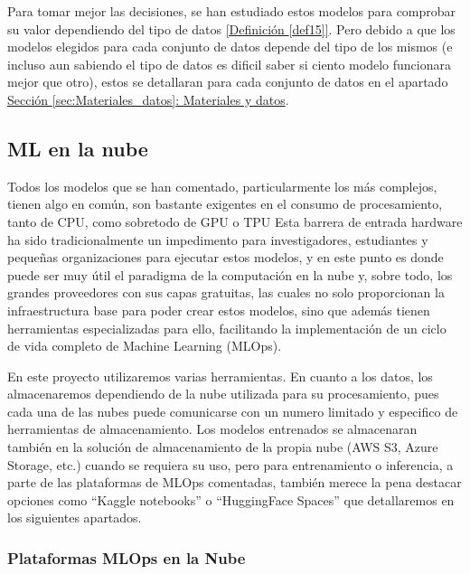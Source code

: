 Para tomar mejor las decisiones, se han estudiado estos modelos para comprobar su valor dependiendo del tipo de datos \hyperref[def15]{[Definición \ref*{def15}]}. Pero debido a que los modelos elegidos para cada conjunto de datos depende del tipo de los mismos (e incluso aun sabiendo el tipo de datos es dificil saber si ciento modelo funcionara mejor que otro), estos se detallaran para cada conjunto de datos en el apartado \hyperref[sec:Materiales_datos]{Sección \ref*{sec:Materiales_datos}: Materiales y datos}.

\subsection{ML en la nube}

Todos los modelos que se han comentado, particularmente los más complejos, tienen algo en común, son bastante exigentes en el consumo de procesamiento, tanto de CPU, como sobretodo de GPU o TPU \citep{Sze_2017} Esta barrera de entrada hardware ha sido tradicionalmente un impedimento para investigadores, estudiantes y pequeñas organizaciones para ejecutar estos modelos, y en este punto es donde puede ser muy útil el paradigma de la computación en la nube y, sobre todo, los grandes proveedores con sus capas gratuitas, las cuales no solo proporcionan la infraestructura base para poder crear estos modelos, sino que además tienen herramientas especializadas para ello, facilitando la implementación de un ciclo de vida completo de Machine Learning (MLOps).

En este proyecto utilizaremos varias herramientas. En cuanto a los datos, los almacenaremos dependiendo de la nube utilizada para su procesamiento, pues cada una de las nubes puede comunicarse con un numero limitado y especifico de herramientas de almacenamiento. Los modelos entrenados se almacenaran también en la solución de almacenamiento de la propia nube (AWS S3, Azure Storage, etc.) cuando se requiera su uso, pero para entrenamiento o inferencia, a parte de las plataformas de MLOps comentadas, también merece la pena destacar opciones como ``Kaggle notebooks'' o ``HuggingFace Spaces'' que detallaremos en los siguientes apartados.

\subsubsection{Plataformas MLOps en la Nube}

